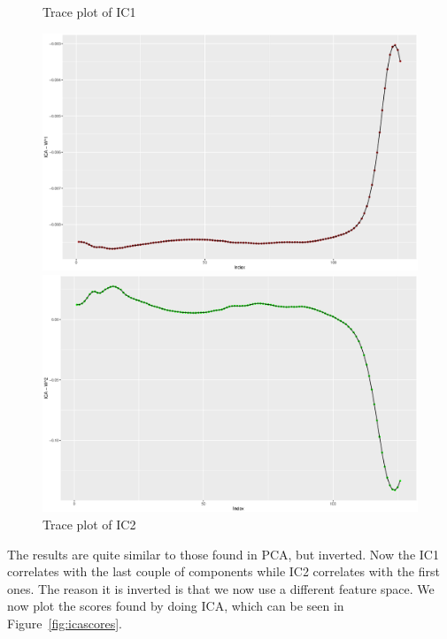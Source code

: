 \documentclass[a4paper,12pt]{article}
\begin{document}
        \begin{figure}[H]
            \centering
            \begin{minipage}[]{0.49\textwidth}
                \caption{Trace plot of IC1\label{fig:x750ical}}
                \includegraphics[width=\textwidth]{share/A2_trace_ICA1.eps}
            \end{minipage}
            \begin{minipage}[]{0.49\textwidth}
                \caption{Trace plot of IC2\label{fig:x752ical}}
                \includegraphics[width=\textwidth]{share/A2_trace_ICA2.eps}
            \end{minipage}
        \end{figure}

        The results are quite similar to those found in PCA, but inverted. Now the IC1 correlates with the last couple of components while IC2 correlates with the first ones. The reason it is inverted is that we now use a different feature space.
        We now plot the scores found by doing ICA, which can be seen in Figure~\ref{fig:icascores}.
\end{document}
